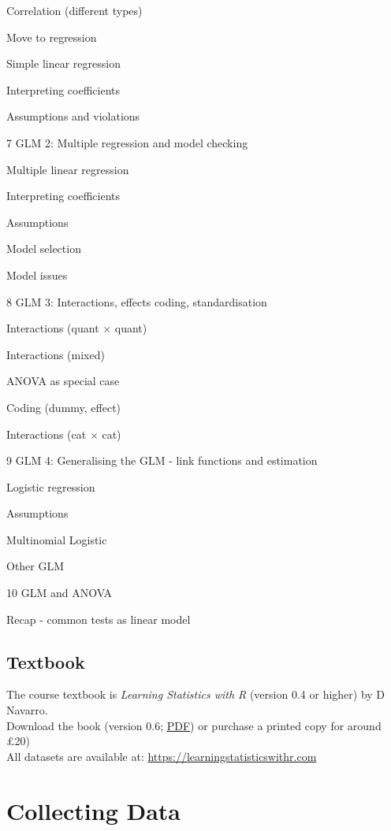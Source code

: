 \documentclass[]{book}
\begin{document}
Correlation (different types)

Move to regression

Simple linear regression

Interpreting coefficients

Assumptions and violations

\textbar{}
\textbar{} 7 \textbar{} GLM 2: Multiple regression and model checking \textbar{}

Multiple linear regression

Interpreting coefficients

Assumptions

Model selection

Model issues

\textbar{}
\textbar{} 8 \textbar{} GLM 3: Interactions, effects coding, standardisation \textbar{}

Interactions (quant \(\times\) quant)

Interactions (mixed)

ANOVA as special case

Coding (dummy, effect)

Interactions (cat \(\times\) cat)

\textbar{}
\textbar{} 9 \textbar{} GLM 4: Generalising the GLM - link functions and estimation \textbar{}

Logistic regression

Assumptions

Multinomial Logistic

Other GLM

\textbar{}
\textbar{} 10 \textbar{} GLM and ANOVA \textbar{}

Recap - common tests as linear model

\textbar{}

\hypertarget{textbook}{%
\section*{Textbook}\label{textbook}}

The course textbook is \emph{Learning Statistics with R} (version 0.4 or higher) by D Navarro.\\
Download the book (version 0.6; \href{https://learningstatisticswithr.com/lsr-0.6.pdf}{PDF}) or purchase a printed copy for around £20)\\
All datasets are available at: \url{https://learningstatisticswithr.com}

\hypertarget{chap-collecting-data}{%
\chapter{Collecting Data}\label{chap-collecting-data}}
\end{document}
